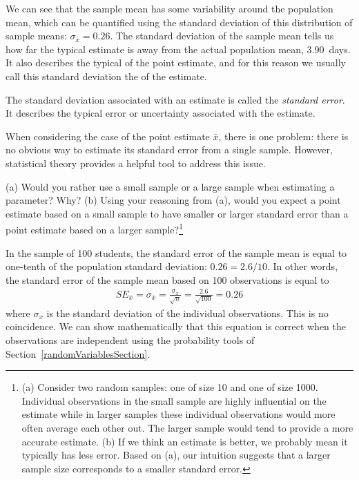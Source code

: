We can see that the sample mean has some variability around the population mean, which can be quantified using the standard deviation of this distribution of sample means: $\sigma_{\bar{x}} = 0.26$. The standard deviation of the sample mean tells us how far the typical estimate is away from the actual population mean, 3.90~days. It also describes the typical  of the point estimate, and for this reason we usually call this standard deviation the  of the estimate.

\begin{termBox}{
The standard deviation associated with an estimate is called the \emph{standard error}. It describes the typical error or uncertainty associated with the estimate.}
\end{termBox}

When considering the case of the point estimate $\bar{x}$, there is one problem: there is no obvious way to estimate its standard error from a single sample. However, statistical theory provides a helpful tool to address this issue. 

\begin{exercise}
(a) Would you rather use a small sample or a large sample when estimating a parameter? Why? (b) Using your reasoning from (a), would you expect a point estimate based on a small sample to have smaller or larger standard error than a point estimate based on a larger sample?\footnote{(a) Consider two random samples: one of size 10 and one of size 1000. Individual observations in the small sample are highly influential on the estimate while in larger samples these individual observations would more often average each other out. The larger sample would tend to provide a more accurate estimate. (b) If we think an estimate is better, we probably mean it typically has less error. Based on (a), our intuition suggests that a larger sample size corresponds to a smaller standard error.}
\end{exercise}

In the sample of 100 students, the standard error of the sample mean is equal to one-tenth of the population standard deviation: $0.26 = 2.6 / 10$. In other words, the standard error of the sample mean based on 100 observations is equal to
\begin{eqnarray*}
SE_{\bar{x}} = \sigma_{\bar{x}} = \frac{\sigma_{x}}{\sqrt{n}} = \frac{2.6}{\sqrt{100}} = 0.26
\end{eqnarray*}
where $\sigma_{x}$ is the standard deviation of the individual observations. This is no coincidence. We can show mathematically that this equation is correct when the observations are independent using the probability tools of Section~\ref{randomVariablesSection}.

